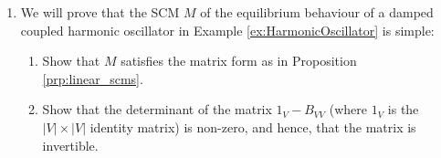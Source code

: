 \begin{enumerate}
\begin{gradedsolution}
\begin{enumerate}
\begin{center}
			\end{center}
			\item {} This follows from the series of equivalences between $f$ and $\tilde{f}$ in the proof of Proposition \ref*{prp:scm_acyclification_properties}. Check this!
			\item {} E.g. intervene $X_A=x_a$. Then in $M$, $B$ is affected by $x_a$, but in $M^{\text{acy}}$, it is not. This should be proven formally.
			\item {} The first two are false, the third is true. Prove this!
		\end{enumerate}
	\end{gradedsolution}

	\item %
	We will prove that the SCM $M$ of the equilibrium behaviour of a damped coupled harmonic oscillator in Example \ref*{ex:HarmonicOscillator} is simple:

	\begin{enumerate}
		\item Show that $M$ satisfies the matrix form as in Proposition \ref*{prp:linear_scms}.
		\item \label{eq:tridiag} Show that the determinant of the matrix $1_{V}-B_{VV}$ (where $1_V$ is the $|V|\times |V|$ identity matrix) is non-zero, and hence, that the matrix is invertible.


\end{enumerate}
\end{enumerate}
